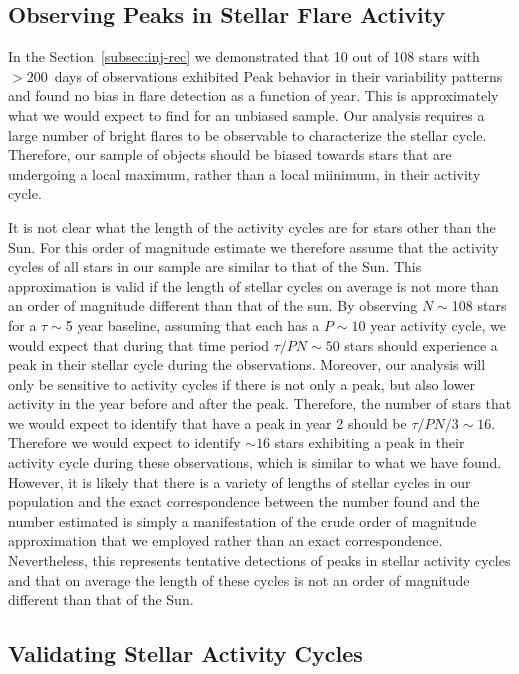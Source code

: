 \documentclass[twocolumn, linenumbers]{aastex631}
\begin{document}
\subsection{Observing Peaks in Stellar Flare Activity}

In the Section~\ref{subsec:inj-rec} we demonstrated that 10 out of 108 stars with $> 200$~days of observations exhibited Peak behavior in their variability patterns and found no bias in flare
detection as a function of year. This is approximately what we would expect to find for an unbiased sample. Our analysis requires a large number of bright flares to be observable to
characterize the stellar cycle. Therefore, our sample of objects should be biased towards stars that are undergoing a local maximum, rather than a local miinimum, in their activity cycle.

It is not clear what the length of the activity cycles are for stars other than the Sun. For this order of magnitude estimate we therefore assume that the activity cycles of all stars in our
sample are similar to that of the Sun. This approximation is valid   if the length of stellar cycles on average is not more than an order of magnitude different than that of the sun. By
observing $N\sim$108 stars for a $\tau\sim$5 year baseline, assuming that each has a $P\sim10$ year activity cycle, we would expect that during that time period $\tau /P N\sim50$ stars should
experience a peak in their stellar cycle during the observations. Moreover, our analysis will only be sensitive to activity cycles if there is not only a peak, but also lower activity in the
year before and after the peak. Therefore, the number of stars that we would expect to identify that have a peak in year 2 should be $\tau /P N /3\sim16$. Therefore we would expect to identify
$\sim16$ stars exhibiting a peak in their activity cycle during these observations, which is  similar to what we have found. However, it is likely that there is a variety of lengths of stellar
cycles in our population and the exact correspondence between the number found and the number estimated is simply a manifestation of the crude order of magnitude approximation that we employed
rather than an exact correspondence. Nevertheless, this represents  tentative detections of peaks in stellar activity cycles and that on average the length of these cycles is not an order of
magnitude different than that of the Sun.

\subsection{Validating Stellar Activity Cycles}
\end{document}
